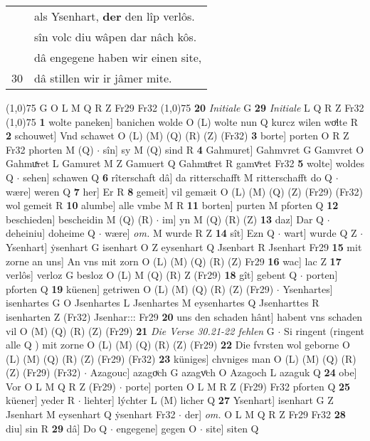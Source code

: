 \documentclass[8pt,a4paper,notitlepage]{article}
\begin{document}
\begin{table}[ht]
\begin{minipage}[t]{0.5\linewidth}
\begin{tabular}{rl}
 & als Ysenhart, \textbf{der} den lîp verlôs.\\ 
 & sîn volc diu wâpen dar nâch kôs.\\ 
 & dâ engegene haben wir einen site,\\ 
30 & dâ stillen wir ir jâmer mite.\\ 
\end{tabular}
\scriptsize
\line(1,0){75} \newline
G O L M Q R Z Fr29 Fr32 \newline
\line(1,0){75} \newline
\textbf{20} \textit{Initiale} G  \textbf{29} \textit{Initiale} L Q R Z Fr32  \newline
\line(1,0){75} \newline
\textbf{1} wolte paneken] banichen wolde O (L) wolte nun Q kurcz wilen woͯlte R \textbf{2} schouwet] Vnd schawet O (L) (M) (Q) (R) (Z) (Fr32) \textbf{3} borte] porten O R Z Fr32 phorten M (Q)  $\cdot$ sîn] sy M (Q) sind R \textbf{4} Gahmuret] Gahmvret G Gamvret O Gahmuͯret L Gamuret M Z Gamuert Q Gahmuͦret R gamvͦret Fr32 \textbf{5} wolte] woldes Q  $\cdot$ sehen] schawen Q \textbf{6} rîterschaft dâ] da ritterschafft M ritterschafft do Q  $\cdot$ wære] weren Q \textbf{7} her] Er R \textbf{8} gemeit] vil gemæit O (L) (M) (Q) (Z) (Fr29) (Fr32) wol gemeit R \textbf{10} alumbe] alle vmbe M R \textbf{11} borten] purten M pforten Q \textbf{12} beschieden] bescheidin M (Q) (R)  $\cdot$ im] yn M (Q) (R) (Z) \textbf{13} daz] Dar Q  $\cdot$ deheiniu] doheime Q  $\cdot$ wære] \textit{om.} M wurde R Z \textbf{14} sît] Ezn Q  $\cdot$ wart] wurde Q Z  $\cdot$ Ysenhart] ẏsenhart G isenhart O Z eysenhart Q Jsenbart R Jsenhart Fr29 \textbf{15} mit zorne an uns] An vns mit zorn O (L) (M) (Q) (R) (Z) Fr29 \textbf{16} wac] lac Z \textbf{17} verlôs] verloz G besloz O (L) M (Q) (R) Z (Fr29) \textbf{18} gît] gebent Q  $\cdot$ porten] pforten Q \textbf{19} küenen] getriwen O (L) (M) (Q) (R) (Z) (Fr29)  $\cdot$ Ysenhartes] isenhartes G O Jsenhartes L Jsenhartes M eysenhartes Q Jsenharttes R isenharten Z (Fr32) Jsenhar::: Fr29 \textbf{20} uns den schaden hânt] habent vns schaden vil O (M) (Q) (R) (Z) (Fr29) \textbf{21} \textit{Die Verse 30.21-22 fehlen} G   $\cdot$ Si ringent (ringent alle Q ) mit zorne O (L) (M) (Q) (R) (Z) (Fr29) \textbf{22} Die fvrsten wol geborne O (L) (M) (Q) (R) (Z) (Fr29) (Fr32) \textbf{23} küniges] chvniges man O (L) (M) (Q) (R) (Z) (Fr29) (Fr32)  $\cdot$ Azagouc] azagoͮch G azagvͦch O Azagoch L azaguk Q \textbf{24} obe] Vor O L M Q R Z (Fr29)  $\cdot$ porte] porten O L M R Z (Fr29) Fr32 pforten Q \textbf{25} küener] yeder R  $\cdot$ liehter] lýchter L (M) licher Q \textbf{27} Ysenhart] isenhart G Z Jsenhart M eysenhart Q ẏsenhart Fr32  $\cdot$ der] \textit{om.} O L M Q R Z Fr29 Fr32 \textbf{28} diu] sin R \textbf{29} dâ] Do Q  $\cdot$ engegene] gegen O  $\cdot$ site] siten Q \newline

\end{minipage}
\end{table}
\end{document}
